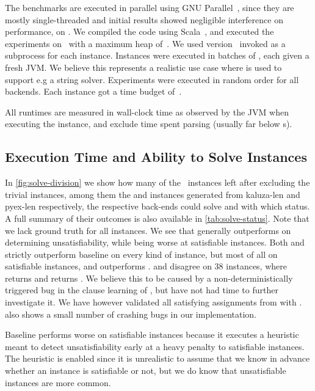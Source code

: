 \documentclass[acmsmall,review,anonymous,screen]{acmart}\settopmatter{printfolios=true,printccs=true,printacmref=true}
\theoremstyle{definition}
\begin{document}
The benchmarks are executed in parallel using GNU Parallel~\cite{parallel},
since they are mostly single-threaded and initial results showed negligible
interference on performance, on \BenchmarkRig{}. We compiled the code using
Scala~\ScalaVersion{}, and executed the experiments on~\JvmVersion{} with a
maximum heap of~\MaxHeapSize{}. We used \Nuxmv{} version~\NuxmvVersion{} invoked
as a subprocess for each instance. Instances were executed in batches of
\BatchSize{}, each given a fresh JVM. We believe this represents a realistic use
case where \Calculus{} is used to support e.g a string solver. Experiments were
executed in random order for all backends. Each instance got a time budget
of~\RuntimeTimeout.

All runtimes are measured in wall-clock time as observed by the JVM when
executing the instance, and exclude time spent parsing (usually far below
s).

\subsection{Execution Time and Ability to Solve Instances}\label{sec:runtime}

In \cref{fig:solve-division} we show how many of the~\NrBenchmarks{} instances left after excluding the trivial instances, among them the  and  instances generated from kaluza-len and pyex-len respectively,
the respective back-ends could solve and with which status. A full summary of
their outcomes is also available in \cref{tab:solve-status}. Note that we lack
ground truth for all instances. We see that \Calculus{} generally outperforms
\Nuxmv{} on determining unsatisfiability, while being worse at satisfiable
instances. Both \Nuxmv{} and \Calculus{} strictly outperform baseline on every
kind of instance, but most of all on satisfiable instances, and \Calculus{}
outperforms \Nuxmv{}. \Nuxmv{} and \Calculus{} disagree on 38 instances, where
\Nuxmv{} returns \Sat{} and \Calculus{} returns \Unsat{}. We believe this to be
caused by a non-deterministically triggered bug in the clause learning of
\Calculus{}, but have not had time to further investigate it. We have however
validated all  satisfying assignments from \Calculus{} with
\Nuxmv{}.  also shows a small number of crashing bugs in
our implementation.

Baseline performs worse on satisfiable instances because it executes a heuristic
meant to detect unsatisfiability early at a heavy penalty to satisfiable
instances. The heuristic is enabled since it is unrealistic to assume that we
know in advance whether an instance is satisfiable or not, but we do know that
unsatisfiable instances are more common.
\end{document}
